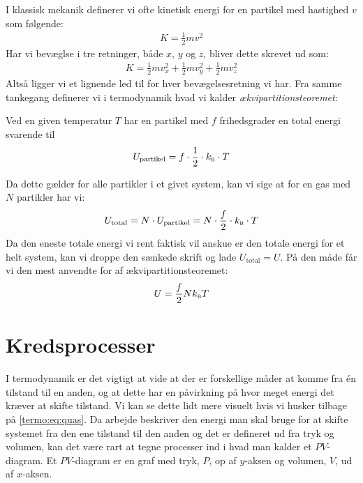 \documentclass[crop=false, class=memoir]{standalone}
\begin{document}
I klassisk mekanik definerer vi ofte kinetisk energi for en partikel med hastighed $v$ som følgende:
\begin{align}
    K = \frac{1}{2}m v^2
\end{align}
Har vi bevæglse i tre retninger, både $x$, $y$ og $z$, bliver dette skrevet ud som:
\begin{align}
    K = \frac{1}{2}m v_x^2 + \frac{1}{2}m v_y^2 + \frac{1}{2}m v_z^2
\end{align}
Altså ligger vi et lignende led til for hver bevægelsesretning vi har. Fra samme tankegang definerer vi i termodynamik hvad vi kalder \emph{ækvipartitionsteoremet}: 
\begin{center}
    Ved en given temperatur $T$ har en partikel med $f$ frihedsgrader en total energi svarende til
    \begin{align}
        U_{\text{partikel}} = f\cdot \frac{1}{2}\cdot k_\textsc{b} \cdot T
    \end{align}
\end{center}
Da dette gælder for alle partikler i et givet system, kan vi sige at for en gas med $N$ partikler har vi:
\begin{align}
    U_{\text{total}} = N\cdot U_{\text{partikel}} = N\cdot  \frac{f}{2}\cdot k_\textsc{b} \cdot T
\end{align}
Da den eneste totale energi vi rent faktisk vil anskue er den totale energi for et helt system, kan vi droppe den sænkede skrift og lade $U_{\text{total}} = U$. På den måde får vi den mest anvendte for af ækvipartitionsteoremet:
\begin{align}
    U = \frac{f}{2}N k_\textsc{b} T
    \label{termo:eq:ekvi}
\end{align}

\section{Kredsprocesser}

 I termodynamik er det vigtigt at vide at der er forskellige måder at komme fra én tilstand til en anden, og at dette har en påvirkning på hvor meget energi det kræver at skifte tilstand. Vi kan se dette lidt mere visuelt hvis vi husker tilbage på \cref{termo:eq:quas}. Da arbejde beskriver den energi man skal bruge for at skifte systemet fra den ene tilstand til den anden og det er defineret ud fra tryk og volumen, kan det være rart at tegne processer ind i hvad man kalder et $PV$-diagram. Et $PV$-diagram er en graf med tryk, $P$, op af $y$-aksen og volumen, $V$, ud af $x$-aksen. 
 
\end{document}
